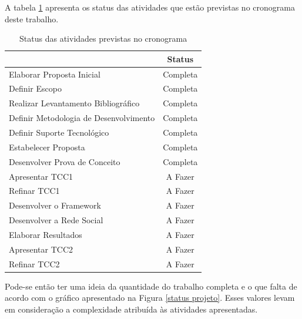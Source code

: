 A tabela \ref{status atividades} apresenta os status das atividades que estão previstas no cronograma deste trabalho.

\newpage

\begin{table}[h]
\centering
\caption{Status das atividades previstas no cronograma}
\label{status atividades}
\begin{tabular}{|l|c|}
\hline
                                       & Status   \\ \hline
Elaborar Proposta Inicial              & Completa \\ \hline
Definir Escopo                         & Completa \\ \hline
Realizar Levantamento Bibliográfico    & Completa \\ \hline
Definir Metodologia de Desenvolvimento & Completa \\ \hline
Definir Suporte Tecnológico            & Completa \\ \hline
Estabelecer Proposta                   & Completa \\ \hline
Desenvolver Prova de Conceito          & Completa \\ \hline
Apresentar TCC1                        & A Fazer  \\ \hline
Refinar TCC1                           & A Fazer  \\ \hline
Desenvolver o Framework                & A Fazer  \\ \hline
Desenvolver a Rede Social              & A Fazer  \\ \hline
Elaborar Resultados                    & A Fazer  \\ \hline
Apresentar TCC2                        & A Fazer  \\ \hline
Refinar TCC2                           & A Fazer  \\ \hline
\end{tabular}
\end{table}

Pode-se então ter uma ideia da quantidade do trabalho completa e o que falta de acordo com o gráfico apresentado na Figura \ref{status projeto}. Esses valores levam em consideração a complexidade atribuída às atividades apresentadas.

